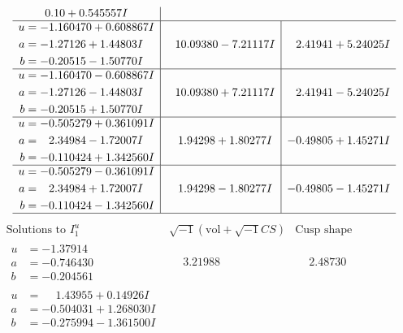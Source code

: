 \documentclass[1p]{elsarticle_modified}
\theoremstyle{definition}
\newcommand{\I}{\sqrt{-1}}
\begin{document}
$$\begin{array}{c|c|c}
0. 10   + 0.545557 I \\ \hline\begin{aligned}
u &= -1.160470 + 0.608867 I \\
a &= -1.27126 + 1.44803 I \\
b &= -0.20515 - 1.50770 I\end{aligned}
 & \phantom{-}10.09380 - 7.21117 I & \phantom{-}2.41941 + 5.24025 I \\ \hline\begin{aligned}
u &= -1.160470 - 0.608867 I \\
a &= -1.27126 - 1.44803 I \\
b &= -0.20515 + 1.50770 I\end{aligned}
 & \phantom{-}10.09380 + 7.21117 I & \phantom{-}2.41941 - 5.24025 I \\ \hline\begin{aligned}
u &= -0.505279 + 0.361091 I \\
a &= \phantom{-}2.34984 - 1.72007 I \\
b &= -0.110424 + 1.342560 I\end{aligned}
 & \phantom{-}1.94298 + 1.80277 I & -0.49805 + 1.45271 I \\ \hline\begin{aligned}
u &= -0.505279 - 0.361091 I \\
a &= \phantom{-}2.34984 + 1.72007 I \\
b &= -0.110424 - 1.342560 I\end{aligned}
 & \phantom{-}1.94298 - 1.80277 I & -0.49805 - 1.45271 I\\
 \hline 
 \end{array}$$\newpage$$\begin{array}{c|c|c}  
\text{Solutions to }I^u_{1}& \I (\text{vol} + \sqrt{-1}CS) & \text{Cusp shape}\\
 \hline 
\begin{aligned}
u &= -1.37914\phantom{ +0.000000I} \\
a &= -0.746430\phantom{ +0.000000I} \\
b &= -0.204561\phantom{ +0.000000I}\end{aligned}
 & \phantom{-}3.21988\phantom{ +0.000000I} & \phantom{-}2.48730\phantom{ +0.000000I} \\ \hline\begin{aligned}
u &= \phantom{-}1.43955 + 0.14926 I \\
a &= -0.504031 + 1.268030 I \\
b &= -0.275994 - 1.361500 I\end{aligned}

\end{array}$$
\end{document}
